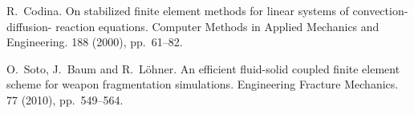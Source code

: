 
\begin{thebibliography}{10}
{\sc R.~Codina}. {On stabilized finite element methods for linear systems of convection-diffusion- reaction equations}. Computer Methods in Applied
Mechanics and Engineering. 188 (2000), pp.~61--82.

{\sc O.~Soto, J.~Baum and R.~L\"ohner}. {An efficient fluid-solid coupled finite element scheme for weapon fragmentation simulations}. Engineering
Fracture Mechanics. 77 (2010), pp.~549--564.
\end{thebibliography}